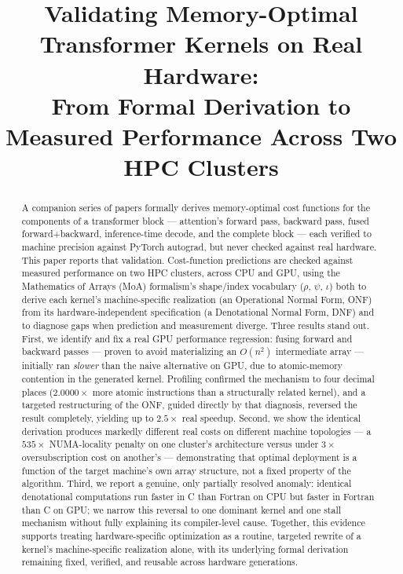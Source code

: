 \documentclass[conference]{IEEEtran}
\begin{document}
\title{Validating Memory-Optimal Transformer Kernels on Real Hardware:\\
From Formal Derivation to Measured Performance Across Two HPC Clusters}

\author{
}

\maketitle

\begin{abstract}
A companion series of papers formally derives memory-optimal cost
functions for the components of a transformer block --- attention's
forward pass, backward pass, fused forward+backward, inference-time
decode, and the complete block --- each verified to machine precision
against PyTorch autograd, but never checked against real hardware. This
paper reports that validation. Cost-function predictions are checked
against measured performance on two HPC clusters, across CPU and GPU,
using the Mathematics of Arrays (MoA) formalism's shape/index
vocabulary ($\rho$, $\psi$, $\iota$) both to derive each kernel's
machine-specific realization (an Operational Normal Form, ONF) from its
hardware-independent specification (a Denotational Normal Form, DNF)
and to diagnose gaps when prediction and measurement diverge. Three
results stand out. First, we identify and fix a real GPU performance
regression: fusing forward and backward passes --- proven to avoid
materializing an $O(n^2)$ intermediate array --- initially ran
\emph{slower} than the naive alternative on GPU, due to atomic-memory
contention in the generated kernel. Profiling confirmed the mechanism
to four decimal places ($2.0000\times$ more atomic instructions than a
structurally related kernel), and a targeted restructuring of the ONF,
guided directly by that diagnosis, reversed the result completely,
yielding up to $2.5\times$ real speedup. Second, we show the identical
derivation produces markedly different real costs on different machine
topologies --- a $535\times$ NUMA-locality penalty on one cluster's
architecture versus under $3\times$ oversubscription cost on another's
--- demonstrating that optimal deployment is a function of the target
machine's own array structure, not a fixed property of the algorithm.
Third, we report a genuine, only partially resolved anomaly: identical
denotational computations run faster in C than Fortran on CPU but
faster in Fortran than C on GPU; we narrow this reversal to one
dominant kernel and one stall mechanism without fully explaining its
compiler-level cause. Together, this evidence supports treating
hardware-specific optimization as a routine, targeted rewrite of a
kernel's machine-specific realization alone, with its underlying formal
derivation remaining fixed, verified, and reusable across hardware
generations.
\end{abstract}
\end{document}
